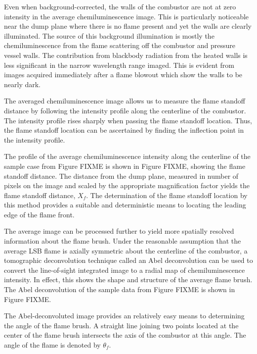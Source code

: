 Even when background-corrected, the walls of the combustor are not at zero intensity in the average chemiluminescence image.
This is particularly noticeable near the dump plane where there is no flame present and yet the walls are clearly illuminated.
The source of this background illumination is mostly the chemiluminescence from the flame scattering off the combustor and pressure vessel walls.
The contribution from blackbody radiation from the heated walls is less significant in the narrow wavelength range imaged.
This is evident from images acquired immediately after a flame blowout which show the walls to be nearly dark.

The averaged chemiluminescence image allows us to measure the flame standoff distance by following the intensity profile along the centerline of the combustor.
The intensity profile rises sharply when passing the flame standoff location.
Thus, the flame standoff location can be ascertained by finding the inflection point in the intensity profile.

The profile of the average chemiluminescence intensity along the centerline of the sample case from Figure FIXME is shown in Figure FIXME, showing the flame standoff distance.
The distance from the dump plane, measured in number of pixels on the image and scaled by the appropriate magnification factor yields the flame standoff distance, \(X_f\).
The determination of the flame standoff location by this method provides a suitable and deterministic means to locating the leading edge of the flame front.

The average image can be processed further to yield more spatially resolved information about the flame brush.
Under the reasonable assumption that the average LSB flame is axially symmetric about the centerline of the combustor, a tomographic deconvolution technique called an Abel deconvolution\cite{1992-dasch} can be used to convert the line-of-sight integrated image to a radial map of chemiluminescence intensity.
In effect, this shows the shape and structure of the average flame brush.
The Abel deconvolution of the sample data from Figure FIXME is shown in Figure FIXME.

The Abel-deconvoluted image provides an relatively easy means to determining the angle of the flame brush.
A straight line joining two points located at the center of the flame brush intersects the axis of the combustor at this angle.
The angle of the flame is denoted by \(\theta_f\).

